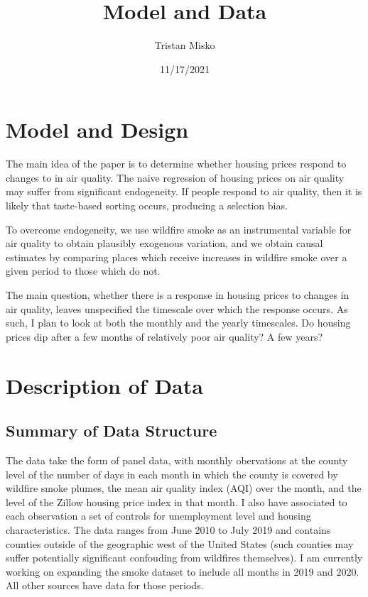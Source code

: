 \documentclass[]{article}
\title{Model and Data}
\author{Tristan Misko}
\date{11/17/2021}
\begin{document}
\maketitle

\section{Model and Design}\label{model-and-design}

\doublespacing
The main idea of the paper is to determine whether housing prices
respond to changes to in air quality. The naive regression of housing
prices on air quality may suffer from significant endogeneity. If people
respond to air quality, then it is likely that taste-based sorting
occurs, producing a selection bias.

To overcome endogeneity, we use wildfire smoke as an instrumental
variable for air quality to obtain plausibly exogenous variation, and we
obtain causal estimates by comparing places which receive increases in
wildfire smoke over a given period to those which do not.

The main question, whether there is a response in housing prices to
changes in air quality, leaves unspecified the timescale over which the
response occurs. As such, I plan to look at both the monthly and the
yearly timescales. Do housing prices dip after a few months of
relatively poor air quality? A few years?

\section{Description of Data}\label{description-of-data}

\subsection{Summary of Data Structure}\label{summary-of-data-structure}

The data take the form of panel data, with monthly obervations at the
county level of the number of days in each month in which the county is
covered by wildfire smoke plumes, the mean air quality index (AQI) over
the month, and the level of the Zillow housing price index in that
month. I also have associated to each observation a set of controls for
unemployment level and housing characteristics. The data ranges from
June 2010 to July 2019 and contains counties outside of the geographic
west of the United States (such counties may suffer potentially
significant confouding from wildfires themselves). I am currently
working on expanding the smoke dataset to include all months in 2019 and
2020. All other sources have data for those periods.
\end{document}
